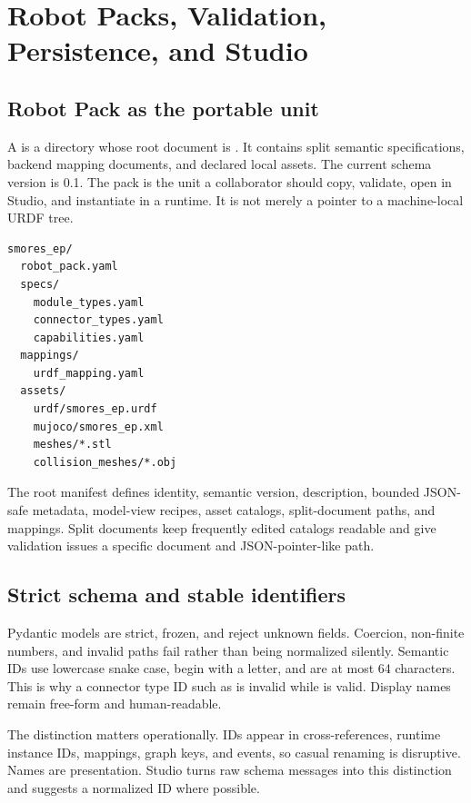 \section{Robot Packs, Validation, Persistence, and Studio}
\label{sec:robotpacks}

\subsection{Robot Pack as the portable unit}

A \robotpack{} is a directory whose root document is
. It contains split semantic specifications, backend mapping
documents, and declared local assets. The current schema version is 0.1. The pack is the
unit a collaborator should copy, validate, open in Studio, and instantiate in a
runtime. It is not merely a pointer to a machine-local URDF tree.

\begin{lstlisting}[language={},caption={Representative Robot Pack layout.}]
smores_ep/
  robot_pack.yaml
  specs/
    module_types.yaml
    connector_types.yaml
    capabilities.yaml
  mappings/
    urdf_mapping.yaml
  assets/
    urdf/smores_ep.urdf
    mujoco/smores_ep.xml
    meshes/*.stl
    collision_meshes/*.obj
\end{lstlisting}

The root manifest defines identity, semantic version, description, bounded JSON-safe
metadata, model-view recipes, asset catalogs, split-document paths, and mappings. Split
documents keep frequently edited catalogs readable and give validation issues a
specific document and JSON-pointer-like path.

\subsection{Strict schema and stable identifiers}

Pydantic models are strict, frozen, and reject unknown fields. Coercion, non-finite
numbers, and invalid paths fail rather than being normalized silently. Semantic IDs use
lowercase snake case, begin with a letter, and are at most 64 characters. This is why a
connector type ID such as  is invalid while  is valid. Display
names remain free-form and human-readable.

The distinction matters operationally. IDs appear in cross-references, runtime
instance IDs, mappings, graph keys, and events, so casual renaming is disruptive.
Names are presentation. Studio turns raw schema messages into this distinction and
suggests a normalized ID where possible.

